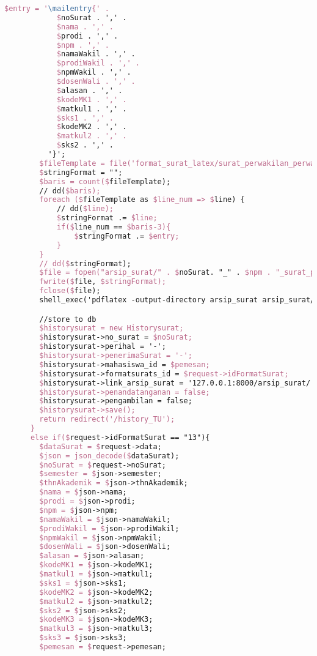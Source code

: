 \begin{lstlisting}[language=tex,basicstyle=\tiny,caption=HistorysuratController.php]
          $entry = '\mailentry{' .
            $noSurat . ',' .
            $nama . ',' .
            $prodi . ',' .
            $npm . ',' .
            $namaWakil . ',' .
            $prodiWakil . ',' .
            $npmWakil . ',' .
            $dosenWali . ',' .
            $alasan . ',' .
            $kodeMK1 . ',' .
            $matkul1 . ',' .
            $sks1 . ',' .
            $kodeMK2 . ',' .
            $matkul2 . ',' .
            $sks2 . ',' .
          '}';
        $fileTemplate = file('format_surat_latex/surat_perwakilan_perwalian_2mk.tex');
        $stringFormat = "";
        $baris = count($fileTemplate);
        // dd($baris);
        foreach ($fileTemplate as $line_num => $line) {
            // dd($line);
            $stringFormat .= $line;
            if($line_num == $baris-3){
                $stringFormat .= $entry;
            }
        }
        // dd($stringFormat);
        $file = fopen("arsip_surat/" . $noSurat. "_" . $npm . "_surat_perwakilan_perwalian_2mk.tex", "w");
        fwrite($file, $stringFormat);
        fclose($file);
        shell_exec('pdflatex -output-directory arsip_surat arsip_surat/' . $noSurat . '_' . $npm . '_surat_perwakilan_perwalian_2mk.tex');

        //store to db
        $historysurat = new Historysurat;
        $historysurat->no_surat = $noSurat;
        $historysurat->perihal = '-';
        $historysurat->penerimaSurat = '-';
        $historysurat->mahasiswa_id = $pemesan;
        $historysurat->formatsurats_id = $request->idFormatSurat;
        $historysurat->link_arsip_surat = '127.0.0.1:8000/arsip_surat/' . $noSurat. '_' . $npm . '_surat_perwakilan_perwalian_2mk.pdf';
        $historysurat->penandatanganan = false;
        $historysurat->pengambilan = false;
        $historysurat->save();
        return redirect('/history_TU');
      }
      else if($request->idFormatSurat == "13"){
        $dataSurat = $request->data;
        $json = json_decode($dataSurat);
        $noSurat = $request->noSurat;
        $semester = $json->semester;
        $thnAkademik = $json->thnAkademik;
        $nama = $json->nama;
        $prodi = $json->prodi;
        $npm = $json->npm;
        $namaWakil = $json->namaWakil;
        $prodiWakil = $json->prodiWakil;
        $npmWakil = $json->npmWakil;
        $dosenWali = $json->dosenWali;
        $alasan = $json->alasan;
        $kodeMK1 = $json->kodeMK1;
        $matkul1 = $json->matkul1;
        $sks1 = $json->sks1;
        $kodeMK2 = $json->kodeMK2;
        $matkul2 = $json->matkul2;
        $sks2 = $json->sks2;
        $kodeMK3 = $json->kodeMK3;
        $matkul3 = $json->matkul3;
        $sks3 = $json->sks3;
        $pemesan = $request->pemesan;


\end{lstlisting}
